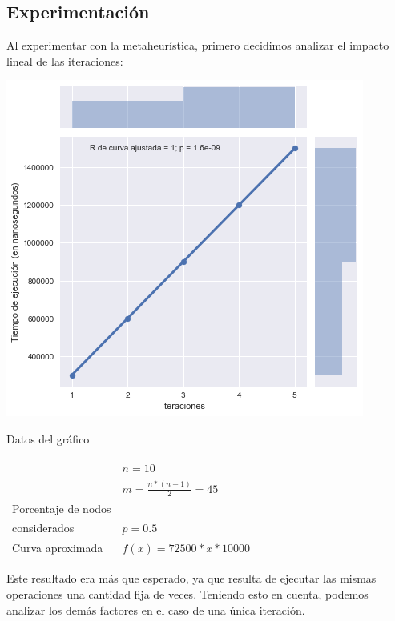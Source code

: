 \subsection{Experimentación}

Al experimentar con la metaheurística, primero decidimos analizar el impacto lineal de las iteraciones:

\noindent
\begin{minipage}{0.55\textwidth}
    \hfill
    \includegraphics[scale=0.6]{img/grasp-it.png}
\end{minipage}
\hfill
\begin{minipage}{0.44\textwidth}
    \begin{center}
        Datos del gráfico

        \begin{tabular}{ | l l |}
            \hline
             & $n = 10$ \\ 
             & $m =  \frac{n * (n-1)}{2} = 45$ \\ 
            Porcentaje de nodos & \\
            considerados & $p = 0.5$ \\ 
            Curva aproximada & $f(x) = 72500 * x * 10000$ \\
            \hline
        \end{tabular}
    \end{center}
\end{minipage}

Este resultado era más que esperado, ya que resulta de ejecutar las mismas operaciones una cantidad fija de veces. Teniendo esto en cuenta, podemos analizar los demás factores en el caso de una única iteración.

